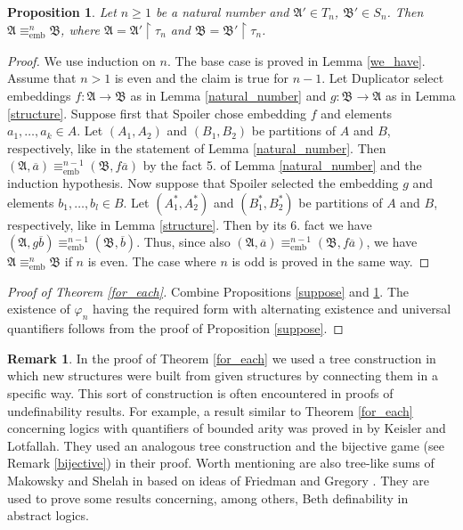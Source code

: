 \documentclass{ndjflart}
\theoremstyle{plain}
\newtheorem{proposition}[conjecture]{Proposition}
\theoremstyle{definition}
\newtheorem{remark}[conjecture]{Remark}
\numberwithin{equation}{section}
\DeclareMathOperator{\emb}{emb}
\begin{document}
\begin{proposition}\label{let}
Let $n \geq 1$ be a natural number and $\mathfrak{A}'\in T_n$, $\mathfrak{B}'\in S_n$.
Then $\mathfrak{A} \equiv_{\emb}^n \mathfrak{B}$, where $\mathfrak{A} = \mathfrak{A}' \upharpoonright \tau_n$ and $\mathfrak{B} = \mathfrak{B}' \upharpoonright \tau_n$.
\end{proposition}
\begin{proof}
We use induction on $n$. The base case is proved in Lemma \ref{we_have}.
Assume that $n>1$ is even and the claim is true for $n-1$.
Let Duplicator select embeddings $f \colon \mathfrak{A} \rightarrow \mathfrak{B}$  as in Lemma \ref{natural_number} and $g \colon \mathfrak{B} \rightarrow \mathfrak{A}$  as in Lemma \ref{structure}.
Suppose first that Spoiler chose embedding $f$ and elements $a_1,\dots,a_k \in A$.
Let $(A_1,A_2)$ and $(B_1,B_2)$ be partitions of $A$ and $B$, respectively, like in the statement of Lemma \ref{natural_number}.
Then $(\mathfrak{A},\overline{a}) \equiv^{n-1}_{\emb} (\mathfrak{B},f\overline{a})$
by the fact 5. of Lemma \ref{natural_number} and the induction hypothesis.
Now suppose that Spoiler selected the embedding $g$ and elements $b_1,\dots,b_l \in B$.
Let $(A^*_1,A^*_2)$ and $(B^*_1,B^*_2)$ be partitions of $A$ and $B$, respectively, like in Lemma \ref{structure}. Then by its 6. fact we have $(\mathfrak{A},g\overline{b}) \equiv^{n-1}_{\emb} (\mathfrak{B},\overline{b})$. 
Thus, since also $(\mathfrak{A},\overline{a}) \equiv^{n-1}_{\emb} (\mathfrak{B},f\overline{a})$, we have $\mathfrak{A} \equiv^n_{\emb} \mathfrak{B}$ if $n$ is even.
The case where $n$ is odd is proved in the same way.
\end{proof}

\begin{proof}[Proof of Theorem \ref{for_each}]
Combine Propositions \ref{suppose} and \ref{let}.
The existence of $\varphi_n$ having the required form with alternating existence and universal quantifiers follows from the proof of Proposition \ref{suppose}.
\end{proof}

\begin{remark}
In the proof of Theorem \ref{for_each} we used a tree construction 
in which new structures were built from given structures by connecting them in a specific way.
This sort of construction is often encountered in proofs of  undefinability results.
For example, a result similar to Theorem \ref{for_each} concerning logics with quantifiers of bounded arity was proved in \cite{Keisler:2011} by Keisler and Lotfallah. They used an analogous tree construction and the bijective game (see Remark \ref{bijective}) in their proof. 
Worth mentioning are also tree-like sums of Makowsky and Shelah in \cite{Makowski:1979} based on ideas of Friedman \cite{Friedman:1973} and Gregory \cite{Gregory:1974}.
They are used to prove some results concerning, among others, Beth definability in abstract logics.
\end{remark}
\end{document}
